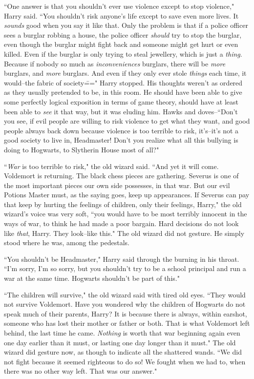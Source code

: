 ``One answer is that you shouldn't ever use violence except to stop violence," Harry said. ``You shouldn't risk anyone's life except to save even more lives. It \emph{sounds} good when you say it like that. Only the problem is that if a police officer sees a burglar robbing a house, the police officer \emph{should} try to stop the burglar, even though the burglar might fight back and someone might get hurt or even killed. Even if the burglar is only trying to steal jewellery, which is just a \emph{thing}. Because if nobody so much as \emph{inconveniences} burglars, there will be \emph{more} burglars, and \emph{more} burglars. And even if they only ever stole \emph{things} each time, it would\---the fabric of society\===" Harry stopped. His thoughts weren't as ordered as they usually pretended to be, in this room. He should have been able to give some perfectly logical exposition in terms of game theory, should have at least been able to \emph{see} it that way, but it was eluding him. Hawks and doves\---``Don't you see, if evil people are willing to risk violence to get what they want, and good people always back down because violence is too terrible to risk, it's\---it's not a good society to live in, Headmaster! Don't you realize what all this bullying is doing to Hogwarts, to Slytherin House most of all?"

``\emph{War} is too terrible to risk," the old wizard said. ``And yet it will come. Voldemort is returning. The black chess pieces are gathering. Severus is one of the most important pieces our own side possesses, in that war. But our evil Potions Master must, as the saying goes, keep up appearances. If Severus can pay that keep by hurting the feelings of children, only their feelings, Harry," the old wizard's voice was very soft, ``you would have to be most terribly innocent in the ways of war, to think he had made a poor bargain. Hard decisions do not look like \emph{that}, Harry. They look\---like this." The old wizard did not gesture. He simply stood where he was, among the pedestals.

``You shouldn't be Headmaster," Harry said through the burning in his throat. ``I'm sorry, I'm so sorry, but you shouldn't try to be a school principal and run a war at the same time. Hogwarts shouldn't be part of this."

``The children will survive," the old wizard said with tired old eyes. ``They would not survive Voldemort. Have you wondered why the children of Hogwarts do not speak much of their parents, Harry? It is because there is always, within earshot, someone who has lost their mother or father or both. That is what Voldemort left behind, the last time he came. \emph{Nothing} is worth that war beginning again even one day earlier than it must, or lasting one day longer than it must." The old wizard did gesture now, as though to indicate all the shattered wands. ``We did not fight because it seemed righteous to do so! We fought when we had to, when there was no other way left. That was our answer."

